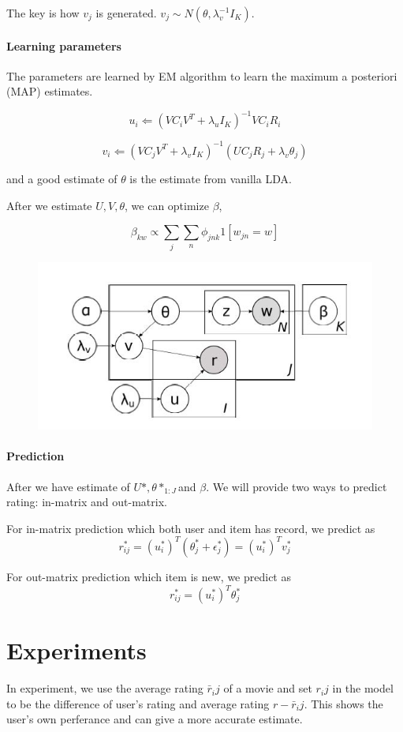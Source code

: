 \documentclass[11pt,a4paper]{article}
\begin{document}
The key is how $v_j$ is generated. $v_j\sim N(\theta,\lambda_v^{-1}I_K)$.

\paragraph{Learning parameters}
The parameters are learned by EM algorithm to learn the maximum a posteriori (MAP) estimates.

\[u_i \Leftarrow (VC_iV^T+\lambda_u I_K)^{-1}VC_i R_i\]

\[v_i \Leftarrow (VC_jV^T+\lambda_vI_K)^{-1}(UC_jR_j+\lambda_v\theta_j)\]

and a good estimate of $\theta$ is the estimate from vanilla LDA.

After we estimate $U,V,\theta$, we can optimize $\beta$,

\[\beta_{kw}\propto\sum_j \sum_n \phi_{jnk}1[w_{jn}=w]\]
\begin{figure}
\centering
\includegraphics[width = \columnwidth]{ctr.jpg}
\caption{}
\label{ctr}
\end{figure}

\paragraph{Prediction}
After we have estimate of $U*, \theta*_{1:J} $and $\beta$. We will provide two ways to predict rating: in-matrix and out-matrix.

For in-matrix prediction which both user and item has record, we predict as
\[r_{ij}^* = (u_i^*)^T(\theta_j^*+\epsilon_j^*) = (u_i^*)^T v_j^*\]


For out-matrix prediction which item is new, we predict as
\[r_{ij}^* =  (u_i^*)^T \theta_j^*\]

\section{Experiments}
In experiment, we use the average rating $\bar{r}_ij$ of a movie and set $r_ij$ in the model to be the difference of user's rating and average rating $r-\bar{r}_ij$. This shows the user's own perferance and can give a more accurate estimate.
\end{document}
